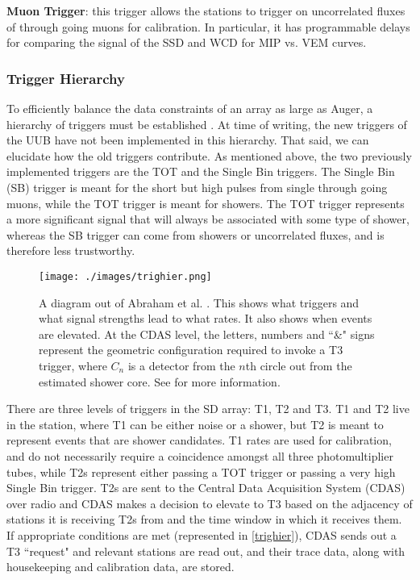 \noindent\textbf{Muon Trigger}: this trigger allows the stations to trigger on uncorrelated fluxes of through going muons for calibration. In particular, it has programmable delays for comparing the signal of the SSD and WCD for MIP vs. VEM curves. 

\subsubsection{Trigger Hierarchy}
To efficiently balance the data constraints of an array as large as Auger, a hierarchy of triggers must be established \cite{ubtriggers}. At time of writing, the new triggers of the UUB have not been implemented in this hierarchy. That said, we can elucidate how the old triggers contribute. As mentioned above, the two previously implemented triggers are the TOT and the Single Bin triggers. The Single Bin (SB) trigger is meant for the short but high pulses from single through going muons, while the TOT trigger is meant for showers. The TOT trigger represents a more significant signal that will always be associated with some type of shower, whereas the SB trigger can come from showers or uncorrelated fluxes, and is therefore less trustworthy.

\begin{figure}[h!]
\begin{center}
\texttt{[image: ./images/trighier.png]}
\caption[Auger Trigger Hierarchy]{A diagram out of Abraham et al. \cite{ubtriggers}. This shows what triggers and what signal strengths lead to what rates. It also shows when events are elevated. At the CDAS level, the letters, numbers and ``\&" signs represent the geometric configuration required to invoke a T3 trigger, where $C_n$ is a detector from the $n$th circle out from the estimated shower core. See \cite{ubtriggers} for more information.}
\label{trighier}
\end{center}
\end{figure}

There are three levels of triggers in the SD array: T1, T2 and T3. T1 and T2 live in the station, where T1 can be either noise or a shower, but T2 is meant to represent events that are shower candidates. T1 rates are used for calibration, and do not necessarily require a coincidence amongst all three photomultiplier tubes, while T2s represent either passing a TOT trigger or passing a very high Single Bin trigger. T2s are sent to the Central Data Acquisition System (CDAS) over radio and CDAS makes a decision to elevate to T3 based on the adjacency of stations it is receiving T2s from and the time window in which it receives them. If appropriate conditions are met (represented in \autoref{trighier}), CDAS sends out a T3 ``request" and relevant stations are read out, and their trace data, along with housekeeping and calibration data, are stored.
